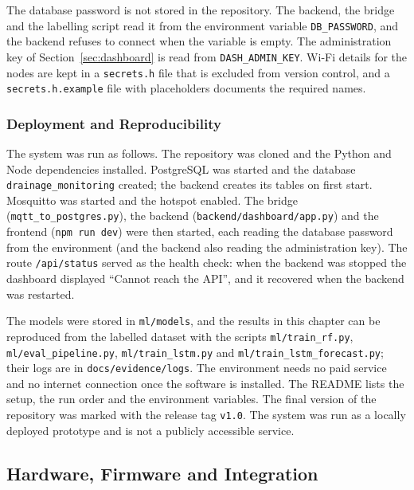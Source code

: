 \documentclass[12pt, a4paper]{article}
\begin{document}
The database password is not stored in the repository. The backend, the bridge and the labelling script read it from the environment variable \texttt{DB\_PASSWORD}, and the backend refuses to connect when the variable is empty. The administration key of Section~\ref{sec:dashboard} is read from \texttt{DASH\_ADMIN\_KEY}. Wi-Fi details for the nodes are kept in a \texttt{secrets.h} file that is excluded from version control, and a \texttt{secrets.h.example} file with placeholders documents the required names.

\subsubsection{Deployment and Reproducibility}

\begin{sloppypar}
The system was run as follows. The repository was cloned and the Python and Node dependencies installed. PostgreSQL was started and the database \texttt{drainage\_monitoring} created; the backend creates its tables on first start. Mosquitto was started and the hotspot enabled. The bridge (\texttt{mqtt\_to\_postgres.py}), the backend (\texttt{backend/dashboard/app.py}) and the frontend (\texttt{npm run dev}) were then started, each reading the database password from the environment (and the backend also reading the administration key). The route \texttt{/api/status} served as the health check: when the backend was stopped the dashboard displayed ``Cannot reach the API'', and it recovered when the backend was restarted.

The models were stored in \texttt{ml/models}, and the results in this chapter can be reproduced from the labelled dataset with the scripts \texttt{ml/train\_rf.py}, \texttt{ml/eval\_pipeline.py}, \texttt{ml/train\_lstm.py} and \texttt{ml/train\_lstm\_forecast.py}; their logs are in \texttt{docs/evidence/logs}. The environment needs no paid service and no internet connection once the software is installed. The README lists the setup, the run order and the environment variables. The final version of the repository was marked with the release tag \texttt{v1.0}. The system was run as a locally deployed prototype and is not a publicly accessible service.
\end{sloppypar}

\subsection{Hardware, Firmware and Integration}
\label{sec:hardware}
\end{document}
